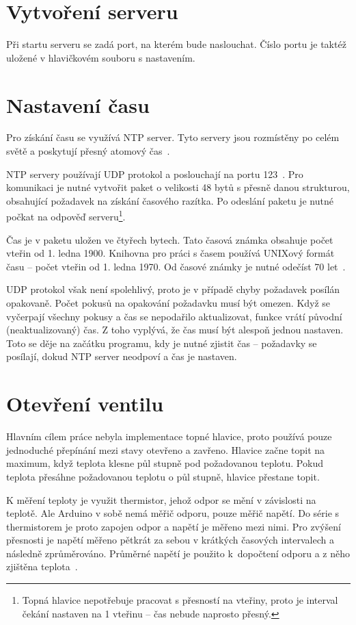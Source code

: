 \documentclass[thesis=B,czech]{FITthesis}[2012/10/20]
\begin{document}
\section{Vytvoření serveru}

Při startu serveru se zadá port, na kterém bude naslouchat. Číslo portu je taktéž uložené v hlavičkovém souboru s nastavením.

\section{Nastavení času}

Pro získání času se využívá NTP server. Tyto servery jsou rozmístěny po celém světě a poskytují přesný atomový čas~\cite{casoveServery}. 

NTP servery používají UDP protokol a poslouchají na portu 123~\cite{port123}. Pro komunikaci je nutné vytvořit paket o velikosti 48 bytů s přesně danou strukturou, obsahující požadavek na získání časového razítka. Po odeslání paketu je nutné počkat na odpověď serveru\footnote{Topná hlavice nepotřebuje pracovat s přesností na vteřiny, proto je interval čekání nastaven na 1 vteřinu – čas nebude naprosto přesný.}.

Čas je v paketu uložen ve čtyřech bytech. Tato časová známka obsahuje počet vteřin od 1. ledna 1900. Knihovna pro práci s časem používá UNIXový formát času – počet vteřin od 1. ledna 1970. Od časové známky je nutné odečíst 70 let~\cite{NTP}.

UDP protokol však není spolehlivý, proto je v případě chyby požadavek posílán opakovaně. Počet pokusů na opakování požadavku musí být omezen. Když se vyčerpají všechny pokusy a čas se nepodařilo aktualizovat, funkce vrátí původní (neaktualizovaný) čas. Z toho vyplývá, že čas musí být alespoň jednou nastaven. Toto se děje na začátku programu, kdy je nutné zjistit čas – požadavky se posílají, dokud NTP server neodpoví a čas je nastaven.


\section{Otevření ventilu}

Hlavním cílem práce nebyla implementace topné hlavice, proto používá pouze jednoduché přepínání mezi stavy otevřeno a zavřeno. Hlavice začne topit na maximum, když teplota klesne půl stupně pod požadovanou teplotu. Pokud teplota přesáhne požadovanou teplotu o půl stupně, hlavice přestane topit.

K měření teploty je využit thermistor, jehož odpor se mění v závislosti na teplotě. Ale Arduino v sobě nemá měřič odporu, pouze měřič napětí. Do série s thermistorem je proto zapojen odpor a napětí je měřeno mezi nimi. Pro zvýšení přesnosti je napětí měřeno pětkrát za sebou v krátkých časových intervalech a následně zprůměrováno. Průměrné napětí je použito k~dopočtení odporu a z něho zjištěna teplota~\cite{thermistor}.
\end{document}
